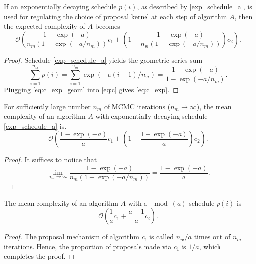 \documentclass[twoside,11pt]{article}
\begin{document}
\begin{proposition}
If an exponentially decaying schedule $p(i)$, as described by \eqref{exp_schedule_a}, is used for regulating the choice of 
proposal kernel at each step of algorithm $A$, then the expected complexity of $A$ becomes
\begin{equation}
\label{eq:c_exp}
\mathcal{O}\left(
\dfrac{1-\exp{(-a)}}{n_m(1-\exp{(-a/n_m)})}c_1+
\left(1-\dfrac{1-\exp{(-a)}}{n_m(1-\exp{(-a/n_m)})}\right)c_2
\right).
\end{equation}
\end{proposition}

\begin{proof}
Schedule \eqref{exp_schedule_a} yields the geometric series sum
\begin{equation}
\label{eq:c_exp_geom}
\sum_{i=1}^{n_m}p(i)=
\sum_{i=1}^{n_m}\exp{(-a(i-1)/n_m)}=
\dfrac{1-\exp{(-a)}}{1-\exp{(-a/n_m)}}.
\end{equation}
Plugging \eqref{eq:c_exp_geom} into \eqref{eq:c} gives \eqref{eq:c_exp}.
\end{proof}

\begin{lemma}
For sufficiently large number $n_m$ of MCMC iterations ($n_m\rightarrow\infty$), the mean complexity of an algorithm $A$ 
with exponentially decaying schedule \eqref{exp_schedule_a} is.
\begin{equation}
\label{eq:c_exp_limit}
\mathcal{O}\left(
\dfrac{1-\exp{(-a)}}{a}c_1+
\left(1-\dfrac{1-\exp{(-a)}}{a}\right)c_2
\right).
\end{equation}
\end{lemma}

\begin{proof}
It suffices to notice that
\begin{equation}
\lim_{n_m\to\infty}\dfrac{1-\exp{(-a)}}{n_m(1-\exp{(-a/n_m)})}=\dfrac{1-\exp{(-a)}}{a}.
\end{equation}
\end{proof}

\begin{proposition}
The mean complexity of an algorithm $A$ with a $\mod{(a)}$ schedule $p(i)$ is
\begin{equation}
\label{eq:c_mod}
\mathcal{O}\left(
\dfrac{1}{a}c_1+
\dfrac{a-1}{a} c_2
\right).
\end{equation}
\end{proposition}

\begin{proof}
The proposal mechanism of algorithm $c_1$ is called $n_m/a$ times out of $n_m$ iterations. Hence, the proportion of proposals
made via $c_1$ is $1/a$, which completes the proof.
\end{proof}
\end{document}
